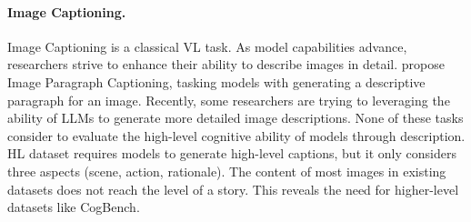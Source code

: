 \paragraph{Image Captioning.}
Image Captioning is a classical VL task. 
As model capabilities advance, researchers strive to enhance their ability to describe images in detail.
\citet{krause2017hierarchical} propose Image Paragraph Captioning, tasking models with generating a descriptive paragraph for an image.
Recently, some researchers \cite{xie2022visual, zhu2023chatgpt, zhuge2023mindstorms,chen2023sharegpt4v} are trying to leveraging the ability of LLMs to generate more detailed image descriptions.
None of these tasks consider to evaluate the high-level cognitive ability of models through description.
HL dataset \cite{cafagna2023hl} requires models to generate high-level captions, but it only considers three aspects (scene, action, rationale).
The content of most images in existing datasets does not reach the level of a story.
This reveals the need for higher-level datasets like CogBench.


